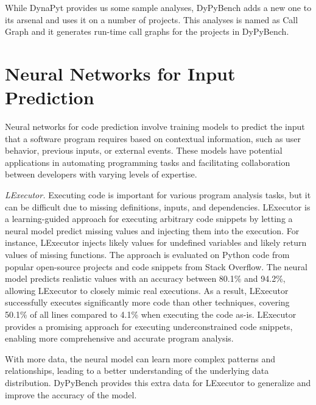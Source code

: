 While DynaPyt provides us some sample analyses, DyPyBench adds a new one to its arsenal and uses it on a number of projects. This analyses is named as Call Graph and it generates run-time call graphs for the projects in DyPyBench. 

\section{Neural Networks for Input Prediction}
Neural networks for code prediction involve training models to predict the input that a software program requires based on contextual information, such as user behavior, previous inputs, or external events.
These models have potential applications in automating programming tasks and facilitating collaboration between developers with varying levels of expertise.

\textit{LExecutor.} Executing code is important for various program analysis tasks, but it can be difficult due to missing definitions, inputs, and dependencies. LExecutor is a learning-guided approach for executing arbitrary code snippets by letting a neural model predict missing values and injecting them into the execution. For instance, LExecutor injects likely values for undefined variables and likely return values of missing functions. The approach is evaluated on Python code from popular open-source projects and code snippets from Stack Overflow. The neural model predicts realistic values with an accuracy between 80.1\% and 94.2\%, allowing LExecutor to closely mimic real executions. As a result, LExecutor successfully executes significantly more code than other techniques, covering 50.1\% of all lines compared to 4.1\% when executing the code as-is. LExecutor provides a promising approach for executing underconstrained code snippets, enabling more comprehensive and accurate program analysis. \cite{LExecutor_2023}

With more data, the neural model can learn more complex patterns and relationships, leading to a better understanding of the underlying data distribution. DyPyBench provides this extra data for LExecutor to generalize and improve the accuracy of the model.  